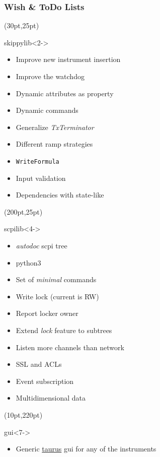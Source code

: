 \documentclass{beamer}
\begin{document}
\begin{frame}
  \frametitle{Wish \& ToDo Lists}
  \begin{textblock*}{0.45\textwidth}(30pt,25pt)
    \begin{block}{skippylib}<2->
      \begin{itemize}
        \item<alert@3> Improve new instrument insertion
        \item Improve the watchdog
        \item Dynamic attributes as property
        \item Dynamic commands
        \item Generalize \emph{TxTerminator}
        \item Different ramp strategies
        \item {\tt WriteFormula}
        \item Input validation
        \item Dependencies with state-like
      \end{itemize}
    \end{block}
  \end{textblock*}
  \begin{textblock*}{0.45\textwidth}(200pt,25pt)
    \begin{exampleblock}{scpilib}<4->%
      \begin{itemize}
        \item<alert@5> \emph{autodoc} scpi tree
        \item<alert@6> python3
        \item Set of \emph{minimal} commands
        \item Write lock (current is RW)
        \item Report locker owner
        \item Extend \emph{lock} feature to subtrees
        \item Listen more channels than network
        \item SSL and ACLs
        \item Event subscription
        \item Multidimensional data
      \end{itemize}
    \end{exampleblock}
  \end{textblock*}
  \begin{textblock*}{0.7\textwidth}(10pt,220pt)
    \begin{alertblock}{gui}<7->
       \begin{itemize}
         \item Generic \href{www.taurus-scada.org}{taurus} gui for any of the instruments
       \end{itemize}
    \end{alertblock}
  \end{textblock*}
\end{frame}
\end{document}
